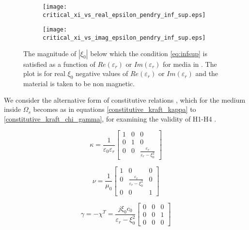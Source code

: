 \begin{figure}[H]
\centering
\begin{subfigure}[b]{0.49\textwidth}
\texttt{[image: critical\_xi\_vs\_real\_epsilon\_pendry\_inf\_sup.eps]}
\end{subfigure}
%
\begin{subfigure}[b]{0.49\textwidth}
\centering
\texttt{[image: critical\_xi\_vs\_imag\_epsilon\_pendry\_inf\_sup.eps]}
\end{subfigure}
\caption{The magnitude of $|\xi_0|$ below which the condition \ref{eq:infsup} is satisfied as a function of $Re(\varepsilon_r)$ or $Im(\varepsilon_r)$ for media in \cite{pendry2016acsphotonics}.
The plot is for real $\xi_0$ negative values of  $Re(\varepsilon_r)$ or $Im(\varepsilon_r)$ and the material is taken to be non magnetic.}
\label{fi:critical_xi_vs_epsilonr_inf_sup}
\end{figure}

We consider the alternative form of constitutive relations , 
which for the medium inside $\Omega_s$ becomes as
in equations \eqref{constitutive_kraft_kappa} to \eqref{constitutive_kraft_chi_gamma}, 
for examining the validity of H1-H4 \cite{noiregolarita}.

\begin{equation} \label{constitutive_kraft_kappa}
\kappa = \frac{1}{\varepsilon_0\varepsilon_r}
\begin{bmatrix}
1 & 0 & 0 \\
0 & 1 & 0 \\
0 & 0 & \frac{\varepsilon_r}{\varepsilon_r-\xi_0^2}
\end{bmatrix}
\end{equation}

\begin{equation} \label{constitutive_kraft_nu}
\nu = \frac{1}{\mu_0}
\begin{bmatrix}
1 & 0 & 0 \\
0 & \frac{\varepsilon_r}{\varepsilon_r - \xi_0^2} & 0 \\
0 & 0 & 1
\end{bmatrix}
\end{equation}

\begin{equation} \label{constitutive_kraft_chi_gamma}
\gamma = -\chi^T = \frac{j\xi_0c_0}{\varepsilon_r-\xi_0^2}
\begin{bmatrix}
0 & 0 & 0 \\
0 & 0 & 1 \\
0 & 0 & 0
\end{bmatrix}
\end{equation}

